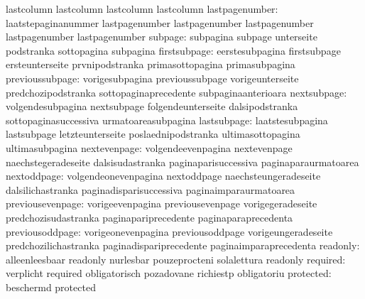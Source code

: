                            lastcolumn                lastcolumn
                           lastcolumn                lastcolumn
           lastpagenumber: laatstepaginanummer       lastpagenumber
                           lastpagenumber            lastpagenumber
                           lastpagenumber            lastpagenumber
                  subpage: subpagina                 subpage
                           unterseite                podstranka
                           sottopagina               subpagina
             firstsubpage: eerstesubpagina           firstsubpage
                           ersteunterseite           prvnipodstranka
                           primasottopagina          primasubpagina
          previoussubpage: vorigesubpagina           previoussubpage
                           vorigeunterseite          predchozipodstranka
                           sottopaginaprecedente     subpaginaanterioara
              nextsubpage: volgendesubpagina         nextsubpage
                           folgendeunterseite        dalsipodstranka
                           sottopaginasuccessiva     urmatoareasubpagina
              lastsubpage: laatstesubpagina          lastsubpage
                           letzteunterseite          poslaednipodstranka
                           ultimasottopagina         ultimasubpagina
             nextevenpage: volgendeevenpagina        nextevenpage
                           naechstegeradeseite       dalsisudastranka
                           paginaparisuccessiva      paginaparaurmatoarea
              nextoddpage: volgendeonevenpagina      nextoddpage
                           naechsteungeradeseite     dalsilichastranka
                           paginadisparisuccessiva   paginaimparaurmatoarea
         previousevenpage: vorigeevenpagina          previousevenpage
                           vorigegeradeseite         predchozisudastranka
                           paginapariprecedente      paginaparaprecedenta
          previousoddpage: vorigeonevenpagina        previousoddpage
                           vorigeungeradeseite       predchozilichastranka
                           paginadispariprecedente   paginaimparaprecedenta
                 readonly: alleenleesbaar            readonly
                           nurlesbar                 pouzeprocteni
                           solalettura               readonly
                 required: verplicht                 required
                           obligatorisch             pozadovane
                           richiestp                 obligatoriu
                protected: beschermd                 protected
